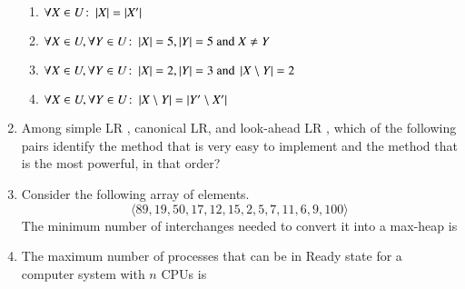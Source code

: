 \documentclass[journal,12pt,onecolumn]{IEEEtran}
\theoremstyle{remark}
\begin{document}
\begin{enumerate}
		\hfill{}
		
		\begin{enumerate}
			\item $\forall X \in U \colon \left\vert X\right\vert = \left\vert X'\right\vert$
			\item $\forall X \in U, \forall Y \in U \colon \left\vert X\right\vert = 5, \left\vert Y\right\vert = 5 \text{ and } X \neq Y$
			\item $\forall X \in U, \forall Y \in U \colon \left\vert X\right\vert = 2, \left\vert Y\right\vert = 3 \text{ and } \left\vert X \setminus Y\right\vert = 2$
			\item $\forall X \in U, \forall Y \in U \colon \left\vert X \setminus Y\right\vert = \left\vert Y' \setminus X'\right\vert$
		\end{enumerate}
		
		\item Among simple LR , canonical LR, and look-ahead LR , which of the following pairs identify the method that is very easy to implement and the method that is the most powerful, in that order?
		
		\hfill{}
		
		\begin{enumerate}
		\end{enumerate}
		
		\item Consider the following array of elements.
		$$\langle 89,19,50,17,12,15,2,5,7,11,6,9,100 \rangle$$
		The minimum number of interchanges needed to convert it into a max-heap is
		
		\hfill{\brak{\text{GATE CS 2015}}}
		
		\begin{enumerate}
			\begin{multicols}{4}
				\item $4$
				\item $5$
				\item $2$
				\item $3$
			\end{multicols}
		\end{enumerate}
		
		\item The maximum number of processes that can be in Ready state for a computer system with $n$ CPUs is
		

\end{enumerate}
\end{document}
